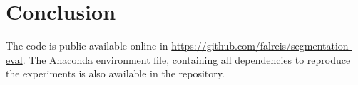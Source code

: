 \section{Conclusion}
\label{sec:conclusion}


The code is public available online in \url{https://github.com/falreis/segmentation-eval}. The Anaconda environment file, containing all dependencies to reproduce the experiments is also available in the repository.
